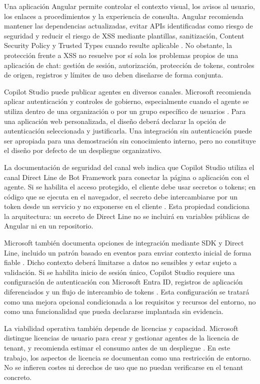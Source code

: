 Una aplicación Angular permite controlar el contexto visual, los avisos al
usuario, los enlaces a procedimientos y la experiencia de consulta. Angular
recomienda mantener las dependencias actualizadas, evitar APIs identificadas como
riesgo de seguridad y reducir el riesgo de XSS mediante plantillas, sanitización,
Content Security Policy y Trusted Types cuando resulte aplicable
\cite{angularSecurity}. No obstante, la protección frente a XSS no resuelve por
sí sola los problemas propios de una aplicación de chat: gestión de sesión,
autorización, protección de tokens, controles de origen, registros y límites de
uso deben diseñarse de forma conjunta.

Copilot Studio puede publicar agentes en diversos canales. Microsoft recomienda
aplicar autenticación y controles de gobierno, especialmente cuando el agente se
utiliza dentro de una organización o por un grupo específico de usuarios
\cite{copilotPublish}. Para una aplicación web personalizada, el diseño deberá
declarar la opción de autenticación seleccionada y justificarla. Una integración
sin autenticación puede ser apropiada para una demostración sin conocimiento
interno, pero no constituye el diseño por defecto de un despliegue organizativo.

La documentación de seguridad del canal web indica que Copilot Studio utiliza el
canal Direct Line de Bot Framework para conectar la página o aplicación con el
agente. Si se habilita el acceso protegido, el cliente debe usar secretos o
tokens; en código que se ejecuta en el navegador, el secreto debe intercambiarse
por un token desde un servicio y no exponerse en el cliente
\cite{copilotWebSecurity}. Esta propiedad condiciona la arquitectura: un secreto
de Direct Line no se incluirá en variables públicas de Angular ni en un
repositorio.

Microsoft también documenta opciones de integración mediante SDK y Direct Line,
incluido un patrón basado en eventos para enviar contexto inicial de forma fiable
\cite{copilotDirectLine}. Dicho contexto deberá limitarse a datos no sensibles y
estar sujeto a validación. Si se habilita inicio de sesión único, Copilot Studio
requiere una configuración de autenticación con Microsoft Entra ID, registros de
aplicación diferenciados y un flujo de intercambio de tokens
\cite{copilotSso}. Esta configuración se tratará como una mejora opcional
condicionada a los requisitos y recursos del entorno, no como una funcionalidad
que pueda declararse implantada sin evidencia.

La viabilidad operativa también depende de licencias y capacidad. Microsoft
distingue licencias de usuario para crear y gestionar agentes de la licencia de
tenant, y recomienda estimar el consumo antes de un despliegue
\cite{copilotLicensing}. En este trabajo, los aspectos de licencia se documentan
como una restricción de entorno. No se infieren costes ni derechos de uso que no
puedan verificarse en el tenant concreto.

